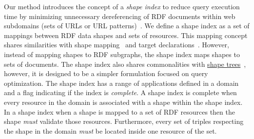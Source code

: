Our method introduces the concept of a \emph{shape index} to reduce query execution time by minimizing unnecessary dereferencing of RDF documents within web subdomains (sets of URLs or URL patterns)~.
We define a shape index as a set of mappings between RDF data shapes and sets of resources.
This mapping concept shares similarities with shape mapping~\cite{Gayo2018} and target declarations~\cite{Gayo2018Shacl}.
However, instead of mapping shapes to RDF subgraphs, the shape index maps shapes to sets of documents.
The shape index also shares commonalities with \href{https://shapetrees.org/}{shape trees}~, however, it is designed to be a simpler formulation focused on query optimization.
The shape index has a range of applications defined in a domain and a flag indicating if the index is \emph{complete}.
A shape index is complete when every resource in the domain is associated with a shape within the shape index.
In a shape index when a shape is mapped to a set of RDF resources then the shape \emph{must} validate those resources.
Furthermore, every set of triples respecting the shape in the domain \emph{must} be located inside one resource of the set.

